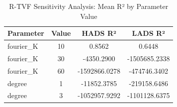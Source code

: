 \begin{table}[h]
\centering
\caption{R-TVF Sensitivity Analysis: Mean R² by Parameter Value}
\label{tab:sensitivity}
\begin{tabular}{lccc}
\toprule
Parameter & Value & HADS R² & LADS R² \\
\midrule
fourier_K & 10 & 0.8562 & 0.6448 \\
fourier_K & 30 & -4350.2900 & -1505685.2338 \\
fourier_K & 60 & -1592866.0278 & -474746.3402 \\
\midrule
degree & 1 & -11852.3785 & -219158.6486 \\
degree & 3 & -1052957.9292 & -1101128.6375 \\
\bottomrule
\end{tabular}
\end{table}